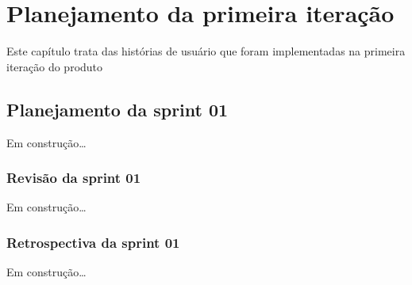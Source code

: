 \chapter{Planejamento da primeira iteração}

  Este capítulo trata das histórias de usuário que foram implementadas na primeira iteração do produto

\section{Planejamento da sprint 01}

  Em construção\ldots

\subsection{Revisão da sprint 01}

  Em construção\ldots

\subsection{Retrospectiva da sprint 01}

  Em construção\ldots

